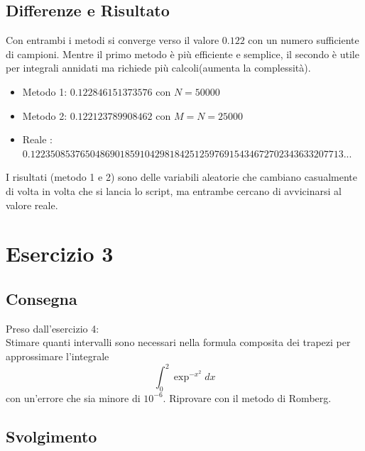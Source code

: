 \documentclass[11pt]{article}
\begin{document}
\subsection{Differenze e Risultato}
Con entrambi i metodi si converge verso il valore $0.122$ con un numero sufficiente di campioni. Mentre il primo metodo è più efficiente e semplice, il secondo è utile per integrali annidati ma richiede più calcoli(aumenta la complessità).
\begin{itemize}
	\item Metodo 1: $0.122846151373576$ con $N=50000$
	\item Metodo 2: $0.122123789908462$ con $M=N=25000$
	\item Reale	: $0.122350853765048690185910429818425125976915434672702343633207713...$
\end{itemize}
I risultati (metodo 1 e 2) sono delle variabili aleatorie che cambiano casualmente di volta in volta che si lancia lo script, ma entrambe cercano di avvicinarsi al valore reale.
\section{Esercizio 3}
\subsection{Consegna}
Preso dall'esercizio 4:\\
Stimare quanti intervalli sono necessari nella formula composita dei trapezi per approssimare l’integrale
\[
\int^2_0\exp^{-x^2}dx
\]
con un’errore che sia minore di $10^{-6}$. Riprovare con il metodo di Romberg.
\subsection{Svolgimento}
\end{document}
